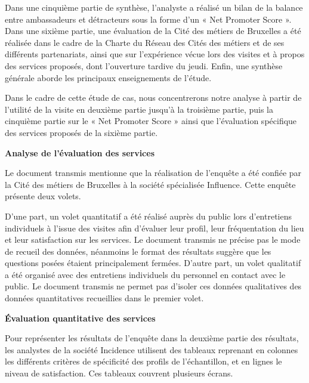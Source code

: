 \documentclass[french,a4paper,12pt]{article}
\begin{document}
{\quad Dans une cinquième partie de synthèse, l’analyste a réalisé un bilan de la balance entre ambassadeurs et détracteurs sous la forme d’un « Net Promoter Score ». Dans une sixième partie, une évaluation de la Cité des métiers de Bruxelles a été réalisée dans le cadre de la Charte du Réseau des Cités des métiers et de ses différents partenariats, ainsi que sur l’expérience vécue lors des visites et à propos des services proposés, dont l’ouverture tardive du jeudi. Enfin, une synthèse générale aborde les principaux enseignements de l’étude.

\quad Dans le cadre de cette étude de cas, nous concentrerons notre analyse à partir de l’utilité de la visite en deuxième partie jusqu’à la troisième partie, puis la cinquième partie sur le « Net Promoter Score » ainsi que l’évaluation spécifique des services proposés de la sixième partie.

\textbf{Analyse de l’évaluation des services}

\quad Le document transmis mentionne que la réalisation de l’enquête a été confiée par la Cité des métiers de Bruxelles à la société spécialisée Influence. Cette enquête présente deux volets.

\quad D’une part, un volet quantitatif a été réalisé auprès du public lors d’entretiens individuels à l’issue des visites afin d’évaluer leur profil, leur fréquentation du lieu et leur satisfaction sur les services. Le document transmis ne précise pas le mode de recueil des données, néanmoins le format des résultats suggère que les questions posées étaient principalement fermées.
D’autre part, un volet qualitatif a été organisé avec des entretiens individuels du personnel en contact avec le public. Le document transmis ne permet pas d’isoler ces données qualitatives des données quantitatives recueillies dans le premier volet. 

\textbf{Évaluation quantitative des services}

\quad Pour représenter les résultats de l’enquête dans la deuxième partie des résultats, les analystes de la société Incidence utilisent des tableaux reprenant en colonnes les différents critères de spécificité des profils de l’échantillon, et en lignes le niveau de satisfaction. Ces tableaux couvrent plusieurs écrans.

}
\end{document}
